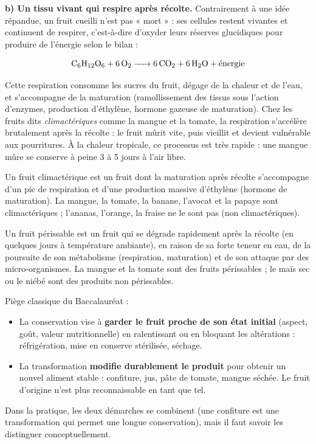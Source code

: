 \documentclass[11pt]{article}
\newcommand{\cle}[1]{{\popxbold\color{popdark}#1}}
\begin{document}
\textbf{b) Un tissu vivant qui respire après récolte.} Contrairement à une idée répandue, un fruit cueilli n'est pas « mort » : ses cellules restent vivantes et continuent de \cle{respirer}, c'est-à-dire d'oxyder leurs réserves glucidiques pour produire de l'énergie selon le bilan :

\[ \ce{C6H12O6 + 6O2 -> 6CO2 + 6H2O} + \text{énergie} \]

Cette respiration consomme les sucres du fruit, dégage de la chaleur et de l'eau, et s'accompagne de la maturation (ramollissement des tissus sous l'action d'enzymes, production d'éthylène, hormone gazeuse de maturation). Chez les fruits dits \emph{climactériques} comme la mangue et la tomate, la respiration s'accélère brutalement après la récolte : le fruit mûrit vite, puis vieillit et devient vulnérable aux pourritures. À la chaleur tropicale, ce processus est très rapide : une mangue mûre se conserve à peine 3 à 5 jours à l'air libre.

\begin{definition}
Un \cle{fruit climactérique} est un fruit dont la maturation après récolte s'accompagne d'un pic de respiration et d'une production massive d'éthylène (hormone de maturation). La mangue, la tomate, la banane, l'avocat et la papaye sont climactériques ; l'ananas, l'orange, la fraise ne le sont pas (non climactériques).
\end{definition}

\begin{definition}
Un \cle{fruit périssable} est un fruit qui se dégrade rapidement après la récolte (en quelques jours à température ambiante), en raison de sa forte teneur en eau, de la poursuite de son métabolisme (respiration, maturation) et de son attaque par des micro-organismes. La mangue et la tomate sont des fruits périssables ; le maïs sec ou le niébé sont des produits non périssables.
\end{definition}

\begin{attention}
Piège classique du Baccalauréat :
\begin{itemize}
\item La \cle{conservation} vise à \textbf{garder le fruit proche de son état initial} (aspect, goût, valeur nutritionnelle) en ralentissant ou en bloquant les altérations : réfrigération, mise en conserve stérilisée, séchage.
\item La \cle{transformation} \textbf{modifie durablement le produit} pour obtenir un nouvel aliment stable : confiture, jus, pâte de tomate, mangue séchée. Le fruit d'origine n'est plus reconnaissable en tant que tel.
\end{itemize}
Dans la pratique, les deux démarches se combinent (une confiture est une transformation qui permet une longue conservation), mais il faut savoir les distinguer conceptuellement.
\end{attention}
\end{document}
